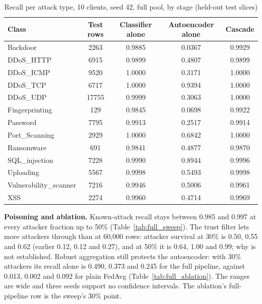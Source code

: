 \begin{table}[H]
\centering
\scriptsize
\setlength{\tabcolsep}{3pt}
\renewcommand{\arraystretch}{1.15}
\begin{tabular}{|l|c|c|c|c|}
\hline
\textbf{Class} & \textbf{Test rows} & \textbf{Classifier alone} & \textbf{Autoencoder alone} & \textbf{Cascade} \\ \hline
Backdoor & 2263 & 0.9885 & 0.0367 & 0.9929 \\ \hline
DDoS\_HTTP & 6915 & 0.9899 & 0.4807 & 0.9899 \\ \hline
DDoS\_ICMP & 9520 & 1.0000 & 0.3171 & 1.0000 \\ \hline
DDoS\_TCP & 6717 & 1.0000 & 0.9394 & 1.0000 \\ \hline
DDoS\_UDP & 17755 & 0.9999 & 0.3063 & 1.0000 \\ \hline
Fingerprinting & 129 & 0.9845 & 0.0698 & 0.9922 \\ \hline
Password & 7795 & 0.9913 & 0.2517 & 0.9914 \\ \hline
Port\_Scanning & 2929 & 1.0000 & 0.6842 & 1.0000 \\ \hline
Ransomware & 691 & 0.9841 & 0.4877 & 0.9870 \\ \hline
SQL\_injection & 7228 & 0.9990 & 0.8944 & 0.9996 \\ \hline
Uploading & 5567 & 0.9998 & 0.5493 & 0.9998 \\ \hline
Vulnerability\_scanner & 7216 & 0.9946 & 0.5006 & 0.9961 \\ \hline
XSS & 2274 & 0.9960 & 0.4714 & 0.9969 \\ \hline
\end{tabular}
\caption{Recall per attack type, 10 clients, seed 42, full pool, by stage (held-out test slices)}
\label{tab:full_per_class}
\end{table}
\textbf{Poisoning and ablation.} Known-attack recall stays between 0.985 and 0.997 at every attacker fraction up to 50\% (Table~\ref{tab:full_sweep}). The trust filter lets more attackers through than at 60{,}000 rows: attacker survival at 30\% is 0.50, 0.55 and 0.62 (earlier 0.12, 0.12 and 0.27), and at 50\% it is 0.64, 1.00 and 0.99; why is not established. Robust aggregation still protects the autoencoder: with 30\% attackers its recall alone is 0.490, 0.373 and 0.245 for the full pipeline, against 0.013, 0.002 and 0.092 for plain FedAvg (Table~\ref{tab:full_ablation}). The ranges are wide and three seeds support no confidence intervals. The ablation's full-pipeline row is the sweep's 30\% point.

